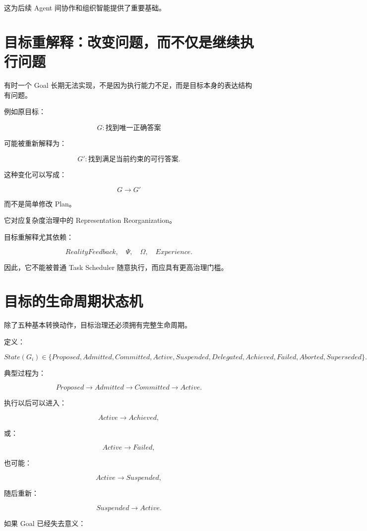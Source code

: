 这为后续 Agent 间协作和组织智能提供了重要基础。


\section{目标重解释：改变问题，而不仅是继续执行问题}

有时一个 Goal 长期无法实现，不是因为执行能力不足，而是目标本身的表达结构有问题。

例如原目标：

\[
G:
\text{找到唯一正确答案}
\]

可能被重新解释为：

\[
G':
\text{找到满足当前约束的可行答案}.
\]

这种变化可以写成：

\[
\boxed{
G
\rightarrow
G'
}
\]

而不是简单修改 Plan。

它对应复杂度治理中的 Representation Reorganization。

目标重解释尤其依赖：

\[
RealityFeedback,
\quad
\Psi,
\quad
\Omega,
\quad
Experience.
\]

因此，它不能被普通 Task Scheduler 随意执行，而应具有更高治理门槛。


\section{目标的生命周期状态机}

除了五种基本转换动作，目标治理还必须拥有完整生命周期。

定义：

\[
State(G_i)
\in
\{
Proposed,
Admitted,
Committed,
Active,
Suspended,
Delegated,
Achieved,
Failed,
Aborted,
Superseded
\}.
\]

典型过程为：

\[
Proposed
\rightarrow
Admitted
\rightarrow
Committed
\rightarrow
Active.
\]

执行以后可以进入：

\[
Active
\rightarrow
Achieved,
\]

或：

\[
Active
\rightarrow
Failed,
\]

也可能：

\[
Active
\rightarrow
Suspended,
\]

随后重新：

\[
Suspended
\rightarrow
Active.
\]

如果 Goal 已经失去意义：

